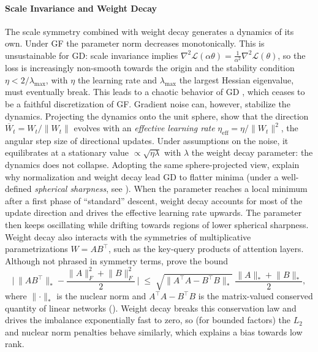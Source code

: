 \documentclass[mathematics,review,submit,moreauthors]{Definitions/mdpi}
\begin{document}
\paragraph{Scale Invariance and Weight Decay}
The scale symmetry combined with weight decay generates a dynamics of its own.
Under GF the parameter norm decreases monotonically.
This is unsustainable for GD: scale invariance implies $\nabla^2 \mathcal{L}(\alpha\theta)=\frac{1}{\alpha^2}\nabla^2 \mathcal{L}(\theta)$, so the loss is increasingly non-smooth towards the origin and the stability condition $\eta<2/\lambda_{\mathrm{max}}$, with $\eta$ the learning rate and $\lambda_{\mathrm{max}}$ the largest Hessian eigenvalue, must eventually break.
This leads to a chaotic behavior of GD \citep{li2020anips}, which ceases to be a faithful discretization of GF.
Gradient noise can, however, stabilize the dynamics.
Projecting the dynamics onto the unit sphere, \citet{li2020anips} show that the direction $\overline{W}_t=W_t/\lVert W_t\rVert$ evolves with an \emph{effective learning rate} $\eta_{\mathrm{eff}}=\eta/\lVert W_t\rVert^2$, the angular step size of directional updates.
Under assumptions on the noise, it equilibrates at a stationary value $\propto\sqrt{\eta\lambda}$ with $\lambda$ the weight decay parameter: the dynamics does not collapse.
Adopting the same sphere-projected view, \citet{lyu2023} explain why normalization and weight decay lead GD to flatter minima (under a well-defined \emph{spherical sharpness}, see ).
When the parameter reaches a local minimum after a first phase of ``standard'' descent, weight decay accounts for most of the update direction and drives the effective learning rate upwards.
The parameter then keeps oscillating while drifting towards regions of lower spherical sharpness.
Weight decay also interacts with the symmetries of multiplicative parametrizations $W=AB^{\top}$, such as the key-query products of attention layers.
Although not phrased in symmetry terms, \citet{kobayashi2024anips} prove the bound
\begin{equation*}
    \Big|\, \lVert AB^{\top}\rVert_{*}-\frac{\lVert A\rVert_F^2+\lVert B\rVert_F^2}{2} \,\Big| \;\le\; \sqrt{\lVert A^{\top}A-B^{\top}B\rVert_{*}}\ \frac{\lVert A\rVert_{*}+\lVert B\rVert_{*}}{2},
\end{equation*}
where $\lVert\cdot\rVert_{*}$ is the nuclear norm and $A^{\top}A-B^{\top}B$ is the matrix-valued conserved quantity of linear networks ().
Weight decay breaks this conservation law and drives the imbalance exponentially fast to zero, so (for bounded factors) the $L_2$ and nuclear norm penalties behave similarly, which explains a bias towards low rank.
\end{document}
